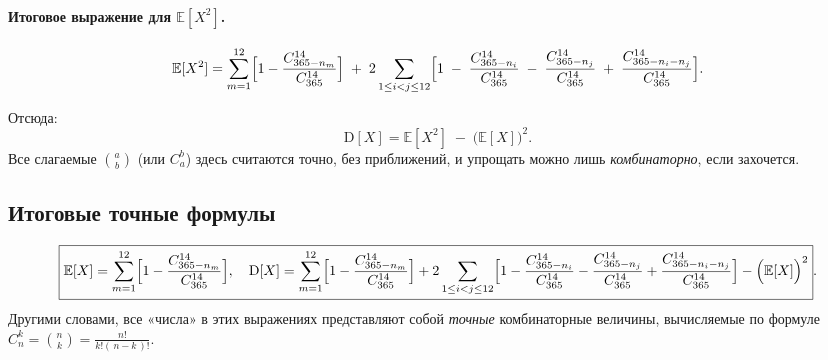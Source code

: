 \documentclass{article}
\begin{document}
\paragraph{Итоговое выражение для \(\mathbb{E}[X^2]\).}

\[
\mathbb{E}[X^2]
= \sum_{m=1}^{12}
\Bigl[
1 - \frac{C_{365 - n_m}^{14}}{C_{365}^{14}}
\Bigr]
\;+\;
2 \sum_{1 \le i < j \le 12}
\Bigl[
1
\;-\; \frac{C_{365 - n_i}^{14}}{C_{365}^{14}}
\;-\; \frac{C_{365 - n_j}^{14}}{C_{365}^{14}}
\;+\; \frac{C_{365 - n_i - n_j}^{14}}{C_{365}^{14}}
\Bigr].
\]

Отсюда:
\[
\mathrm{D}[X]
=
\mathbb{E}[X^2]
\;-\;
\bigl(\mathbb{E}[X]\bigr)^2.
\]
Все слагаемые \(\binom{a}{b}\) (или \(C_a^b\)) здесь считаются точно, без приближений, и упрощать можно лишь \emph{комбинаторно}, если захочется.

\subsection*{Итоговые \textbf{точные} формулы}

\[
\boxed{
\mathbb{E}[X]
= \sum_{m=1}^{12}
\Bigl[
1 - \frac{C_{365 - n_m}^{14}}{C_{365}^{14}}
\Bigr],
\quad
\mathrm{D}[X]
= \sum_{m=1}^{12}
\Bigl[
1 - \frac{C_{365 - n_m}^{14}}{C_{365}^{14}}
\Bigr]
+ 2 \sum_{1 \le i < j \le 12}
\Bigl[
1
- \frac{C_{365 - n_i}^{14}}{C_{365}^{14}}
- \frac{C_{365 - n_j}^{14}}{C_{365}^{14}}
+ \frac{C_{365 - n_i - n_j}^{14}}{C_{365}^{14}}
\Bigr]
- \Bigl(\mathbb{E}[X]\Bigr)^2
}.
\]
Другими словами, все «числа» в этих выражениях представляют собой \emph{точные} комбинаторные величины, вычисляемые по формуле
\(
C_{n}^{k} = \binom{n}{k} = \frac{n!}{k!(\,n-k\,)!}.
\)
\end{document}
